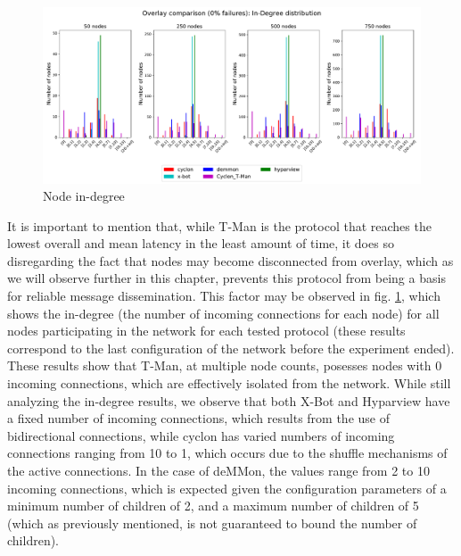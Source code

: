 \begin{figure}
    \centering
    \includegraphics[width=\linewidth]{Chapters/evaluation/figures/membership/membership_inDegree_0_failures.pdf}
    \caption{Node in-degree}
    \label{fig:overlay_proto_res_net_building:0_failures_inDegree}
\end{figure}

It is important to mention that, while T-Man is the protocol that reaches the lowest overall and mean latency in the least amount of time, it does so disregarding the fact that nodes may become disconnected from overlay, which as we will observe further in this chapter, prevents this protocol from being a basis for reliable message dissemination. This factor may be observed in fig. \ref{fig:overlay_proto_res_net_building:0_failures_inDegree}, which shows the in-degree (the number of incoming connections for each node) for all nodes participating in the network for each tested protocol (these results correspond to the last configuration of the network before the experiment ended). These results show that T-Man, at multiple node counts, posesses nodes with 0 incoming connections, which are effectively isolated from the network. While still analyzing the in-degree results, we observe that both X-Bot and Hyparview have a fixed number of incoming connections, which results from the use of bidirectional connections, while cyclon has varied numbers of incoming connections ranging from 10 to 1, which occurs due to the shuffle mechanisms of the active connections. In the case of deMMon, the values range from 2 to 10 incoming connections, which is expected given the configuration parameters of a minimum number of children of 2, and a maximum number of children of 5 (which as previously mentioned, is not guaranteed to bound the number of children).


